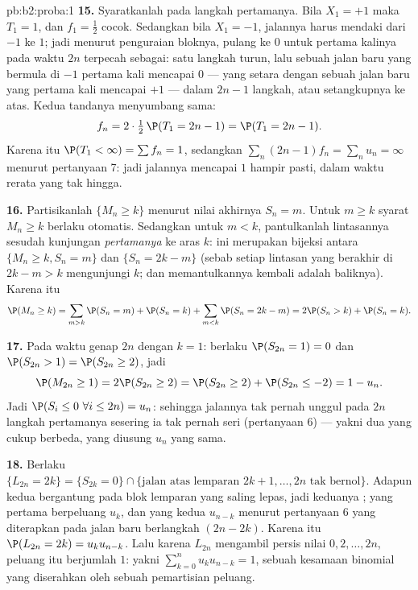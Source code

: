 \begin{solution}{pb:b2:proba:1}
\textbf{15.} Syaratkanlah pada langkah pertamanya. Bila $X_1 = +1$ maka
$T_1 = 1$, dan $f_1 = \frac12$ cocok. Sedangkan bila $X_1 = -1$,
jalannya harus mendaki dari $-1$ ke $1$; jadi menurut penguraian bloknya,
pulang ke $0$ untuk pertama kalinya pada waktu $2n$ terpecah sebagai:
satu langkah turun, lalu sebuah jalan baru yang bermula di $-1$ pertama kali
mencapai $0$ --- yang setara dengan sebuah jalan baru yang pertama kali mencapai
$+1$ --- dalam $2n - 1$ langkah, atau  setangkupnya ke atas.
Kedua tandanya menyumbang sama:
\[
f_n = 2\cdot\tfrac12\,\P(T_1 = 2n - 1) = \P(T_1 = 2n-1) .
\]
Karena itu $\P(T_1 < \infty) = \sum f_n = 1$, sedangkan $\sum_n(2n -
1)f_n = \sum_n u_n = \infty$ menurut pertanyaan 7: jadi jalannya mencapai
$1$ hampir pasti, dalam waktu rerata yang tak hingga.

\textbf{16.} Partisikanlah $\{M_n \geq k\}$ menurut nilai akhirnya
$S_n = m$. Untuk $m \geq k$ syarat $M_n \geq k$ berlaku
otomatis. Sedangkan untuk $m < k$, pantulkanlah lintasannya sesudah
kunjungan \emph{pertamanya} ke aras $k$: ini merupakan bijeksi antara
$\{M_n \geq k, S_n = m\}$ dan $\{S_n = 2k - m\}$ (sebab setiap lintasan
yang berakhir di $2k - m > k$ mengunjungi $k$; dan memantulkannya kembali adalah
baliknya). Karena itu
\[
\P(M_n \geq k)
= \sum_{m > k}\P(S_n = m) + \P(S_n = k)
+ \sum_{m < k}\P(S_n = 2k - m)
= 2\P(S_n > k) + \P(S_n = k).
\]

\textbf{17.} Pada waktu genap $2n$ dengan $k = 1$: berlaku $\P(S_{2n} = 1)
= 0$ dan $\P(S_{2n} > 1) = \P(S_{2n} \geq 2)$, jadi
\[
\P(M_{2n} \geq 1) = 2\P(S_{2n} \geq 2)
= \P(S_{2n} \geq 2) + \P(S_{2n} \leq -2)
= 1 - u_n .
\]
Jadi $\P(S_i \leq 0\ \forall i \leq 2n) = u_n$: sehingga jalannya
tak pernah unggul pada $2n$ langkah pertamanya sesering ia
tak pernah seri (pertanyaan 6) --- yakni dua  yang cukup berbeda,
yang diusung $u_n$ yang sama.

\textbf{18.} Berlaku $\{L_{2n} = 2k\} = \{S_{2k} = 0\} \cap
\{\text{jalan atas lemparan } 2k+1, \dots, 2n \text{ tak
bernol}\}$. Adapun kedua  bergantung pada blok lemparan yang saling lepas,
jadi keduanya ; yang pertama berpeluang $u_k$, dan yang
kedua $u_{n-k}$ menurut pertanyaan 6 yang diterapkan pada jalan baru
berlangkah $(2n-2k)$. Karena itu $\P(L_{2n} = 2k) = u_ku_{n-k}$.
Lalu karena $L_{2n}$ mengambil persis nilai $0, 2, \dots, 2n$,
peluang itu berjumlah $1$:
yakni $\sum_{k=0}^nu_ku_{n-k} = 1$, sebuah kesamaan binomial yang diserahkan
oleh sebuah pemartisian peluang.


\end{solution}
